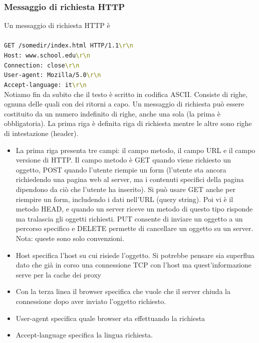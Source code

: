 \documentclass{book}
\begin{document}
\subsubsection*{Messaggio di richiesta HTTP}
Un messaggio di richiesta HTTP è
\\ \\
\texttt{GET /somedir/index.html HTTP/1.1\textcolor{olive}{\textbackslash{r}\textbackslash{n}}}\\
\texttt{Host: www.school.edu\textcolor{olive}{\textbackslash{r}\textbackslash{n}}}\\
\texttt{Connection: close\textcolor{olive}{\textbackslash{r}\textbackslash{n}}}\\
\texttt{User-agent: Mozilla/5.0\textcolor{olive}{\textbackslash{r}\textbackslash{n}}}\\
\texttt{Accept-language: it\textcolor{olive}{\textbackslash{r}\textbackslash{n}}}\\

Notiamo fin da subito che il testo è scritto in codifica ASCII. Consiste di righe, ognuna delle quali con dei ritorni a capo. Un messaggio di richiesta può essere costituito da un numero indefinito di righe, anche una sola (la prima è obbligatoria). La prima riga è definita riga di richiesta mentre le altre sono righe di intestazione (header).

\begin{itemize}
	\item La prima riga presenta tre campi: il campo metodo, il campo URL e il campo versione di HTTP. Il campo metodo è GET quando viene richiesto un oggetto, POST quando l'utente riempie un form (l'utente sta ancora richiedendo una pagina web al server, ma i contenuti specifici della pagina dipendono da ciò che l'utente ha inserito). Si può usare GET anche per riempire un form, includendo i dati nell'URL (query string). Poi vi è il metodo HEAD, e quando un server riceve un metodo di questo tipo risponde ma tralascia gli oggetti richiesti. PUT consente di inviare un oggetto a un percorso specifico e DELETE permette di cancellare un oggetto su un server. Nota: queste sono solo convenzioni.
	\item Host specifica l'host su cui risiede l'oggetto. Si potrebbe pensare sia superflua dato che già in corso una connessione TCP con l'host ma quest'informazione serve per la cache dei proxy
	\item Con la terza linea il browser specifica che vuole che il server chiuda la connessione dopo aver inviato l'oggetto richiesto.
	\item User-agent specifica quale browser sta effettuando la richiesta
	\item Accept-language specifica la lingua richiesta.
\end{itemize}
\end{document}
